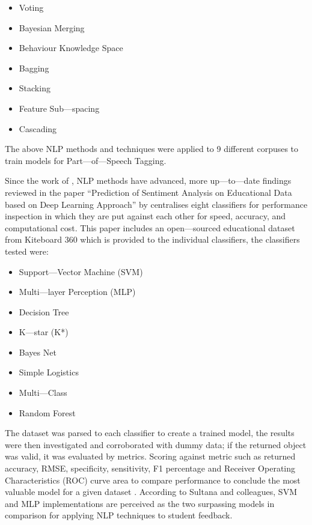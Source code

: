\begin{itemize}
    \item Voting
    \item Bayesian Merging
    \item Behaviour Knowledge Space
    \item Bagging
    \item Stacking
    \item Feature Sub---spacing
    \item Cascading
\end{itemize}

The above NLP methods and techniques were applied to 9 different corpuses to train models for Part---of---Speech Tagging.

Since the work of \textcite{enriquez2013comparative}, NLP methods have advanced, more up---to---date findings reviewed in the paper “Prediction of Sentiment Analysis on Educational Data based on Deep Learning Approach” by \parencite{sultana2018prediction} centralises eight classifiers for performance inspection in which they are put against each other for speed, accuracy, and computational cost. This paper includes an open---sourced educational dataset from Kiteboard 360 which is provided to the individual classifiers, the classifiers tested were:

\begin{itemize}
    \item Support---Vector Machine (SVM)
    \item Multi---layer Perception (MLP)
    \item Decision Tree
    \item K---star (K*)
    \item Bayes Net
    \item Simple Logistics
    \item Multi---Class
    \item Random Forest
\end{itemize}

The dataset was parsed to each classifier to create a trained model, the results were then investigated and corroborated with dummy data; if the returned object was valid, it was evaluated by metrics. Scoring against metric such as returned accuracy, RMSE, specificity, sensitivity, F1 percentage and Receiver Operating Characteristics (ROC) curve area to compare performance to conclude the most valuable model for a given dataset \parencite{sultana2018prediction}. According to Sultana and colleagues, SVM and MLP implementations are perceived as the two surpassing models in comparison for applying NLP techniques to student feedback.

